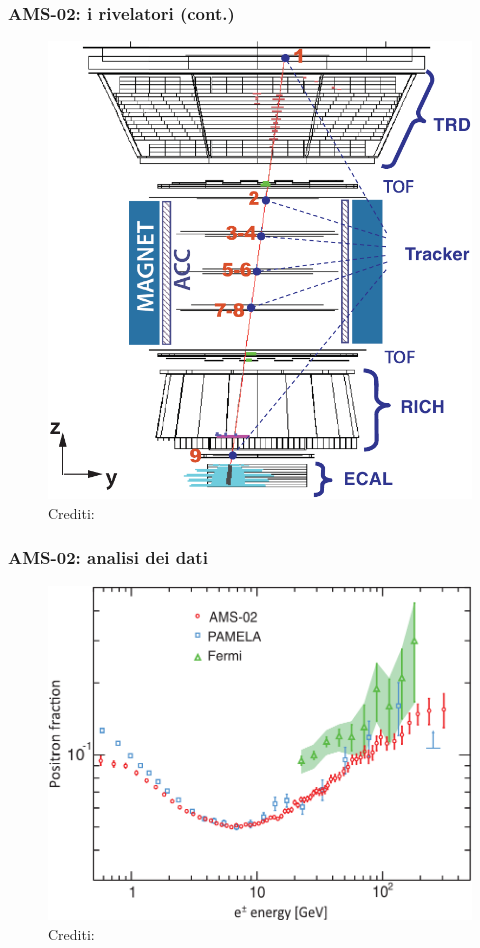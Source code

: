 \documentclass[10pt]{beamer}
\begin{document}
\begin{frame}
  \frametitle{AMS-02: i rivelatori (cont.)}
  \begin{figure}
    \centering
    \includegraphics[width=.5\columnwidth]{ams-rivelatori2}
    \caption{Crediti: \textcite{2013PhRvL.110n1102A}}
  \end{figure}
\end{frame}

\begin{frame}
  \frametitle{AMS-02: analisi dei dati}
  \begin{figure}
    \centering
    \includegraphics[width=.74\columnwidth]{ams1}
    \caption{Crediti: \textcite{2013PhRvL.110n1102A}}
  \end{figure}
\end{frame}
\end{document}
